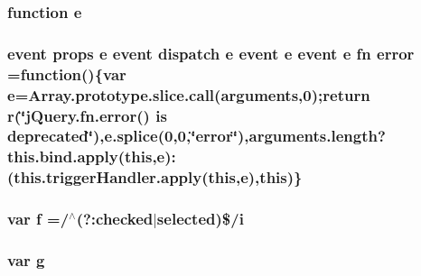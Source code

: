 \subsubsection[{e}]{\setlength{\rightskip}{0pt plus 5cm}function e}\label{jquery-migrate-1_82_81_8min_8js_a2c038346d47955cbe2cb91e338edd7e1}
\hypertarget{jquery-migrate-1_82_81_8min_8js_a5430e5f3d7ed1df717102cddac071a5f}{}
\subsubsection[{error}]{ {\bf event} props {\bf e} {\bf event} {\bf dispatch} {\bf e} {\bf event} {\bf e} {\bf event} {\bf e} {\bf fn} error =function()\{var {\bf e}={\bf Array.\+prototype.\+slice.\+call}(arguments,0);return {\bf r}(\char`\"{}j\+Query.\+fn.\+error() is deprecated\char`\"{}),e.\+splice(0,0,\char`\"{}error\char`\"{}),arguments.\+length?this.\+bind.\+apply({\bf this},{\bf e})\+:(this.\+trigger\+Handler.\+apply({\bf this},{\bf e}),{\bf this})\}}\label{jquery-migrate-1_82_81_8min_8js_a5430e5f3d7ed1df717102cddac071a5f}
\hypertarget{jquery-migrate-1_82_81_8min_8js_a9cf09a2972472098a4c689fd988f4dfc}{}
\subsubsection[{f}]{\setlength{\rightskip}{0pt plus 5cm}var f =/$^\wedge$(?\+:checked$\vert$selected)\$/{\bf i}}\label{jquery-migrate-1_82_81_8min_8js_a9cf09a2972472098a4c689fd988f4dfc}
\hypertarget{jquery-migrate-1_82_81_8min_8js_a103df269476e78897c9c4c6cb8f4eb06}{}
\subsubsection[{g}]{\setlength{\rightskip}{0pt plus 5cm}var g}\label{jquery-migrate-1_82_81_8min_8js_a103df269476e78897c9c4c6cb8f4eb06}
\hypertarget{jquery-migrate-1_82_81_8min_8js_a79fe0eb780a2a4b5543b4dddf8b6188a}{}
